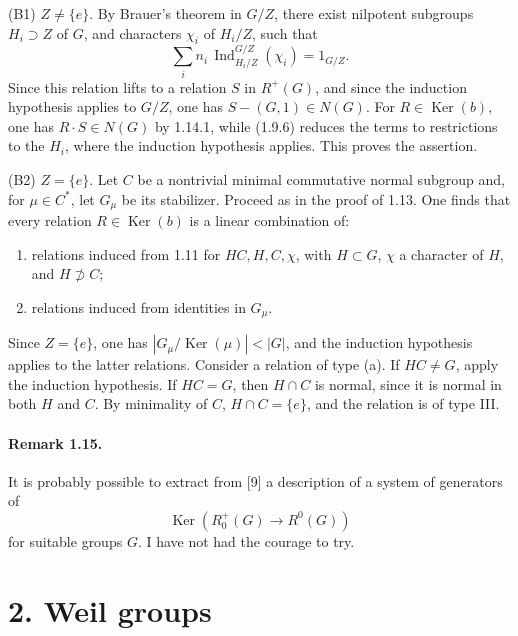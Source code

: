 \documentclass[10pt]{article}
\newcommand{\Ind}{\operatorname{Ind}}
\providecommand{\Ker}{\operatorname{Ker}}
\begin{document}
(B1) \(Z\ne\{e\}\). By Brauer's theorem in \(G/Z\), there exist nilpotent subgroups \(H_i\supset Z\) of \(G\), and characters \(\chi_i\) of \(H_i/Z\), such that
\[
\sum_i n_i\,\Ind_{H_i/Z}^{G/Z}(\chi_i)=1_{G/Z}.
\]
Since this relation lifts to a relation \(S\) in \(R^+(G)\), and since the induction hypothesis applies to \(G/Z\), one has \(S-(G,1)\in N(G)\). For \(R\in\Ker(b)\), one has \(R\cdot S\in N(G)\) by 1.14.1, while (1.9.6) reduces the terms to restrictions to the \(H_i\), where the induction hypothesis applies. This proves the assertion.

(B2) \(Z=\{e\}\). Let \(C\) be a nontrivial minimal commutative normal subgroup and, for \(\mu\in C^*\), let \(G_\mu\) be its stabilizer. Proceed as in the proof of 1.13. One finds that every relation \(R\in\Ker(b)\) is a linear combination of:
\begin{enumerate}[label=(\alph*)]
\item relations induced from 1.11 for \(HC,H,C,\chi\), with \(H\subset G\), \(\chi\) a character of \(H\), and \(H\not\supset C\);
\item relations induced from identities in \(G_\mu\).
\end{enumerate}
Since \(Z=\{e\}\), one has \(|G_\mu/\Ker(\mu)|<|G|\), and the induction hypothesis applies to the latter relations. Consider a relation of type (a). If \(HC\ne G\), apply the induction hypothesis. If \(HC=G\), then \(H\cap C\) is normal, since it is normal in both \(H\) and \(C\). By minimality of \(C\), \(H\cap C=\{e\}\), and the relation is of type III.

\paragraph{Remark 1.15.} It is probably possible to extract from [9] a description of a system of generators of
\[
\Ker(R^+_0(G)\longrightarrow R^0(G))
\]
for suitable groups \(G\). I have not had the courage to try.

\section*{2. Weil groups}
\end{document}
